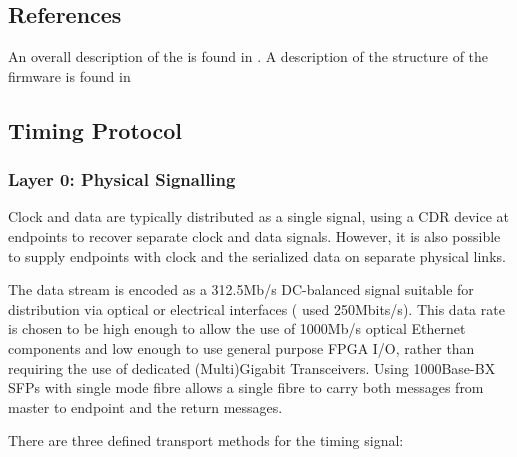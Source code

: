 \documentclass{dune}
\begin{document}
\subsection{References}

An overall description of the  is found in \cite{ref:dts-sp-description}. A description of the structure of the firmware is found in \cite{ref:dts-sp-firmware}

\subsection{Timing Protocol}

\subsubsection{Layer 0: Physical Signalling}

Clock and data are typically distributed as a single signal, using a CDR device at endpoints to recover separate clock and data signals. However, it is also possible to supply endpoints with clock and the serialized data on separate physical links. 

The data stream is encoded as a 312.5Mb/s DC-balanced signal suitable for distribution via optical or electrical interfaces ( used 250Mbits/s). This data rate is chosen to be high enough to allow the use of 1000Mb/s optical Ethernet components and low enough to use general purpose FPGA I/O, rather than requiring the use of dedicated (Multi)Gigabit Transceivers. Using 1000Base-BX SFPs with single mode fibre allows a single fibre to carry both messages from master to endpoint and the return messages.

There are three defined transport methods for the timing signal:
\end{document}
